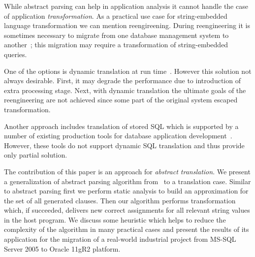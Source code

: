 While abstract parsing can help in application analysis it cannot handle the case of application
\emph{transformation}. As a practical use case for string-embedded language transformation we can mention
reengireening. During reengineering it is sometimes necessary to migrate from one database management 
system to another~\cite{NetDbTransform}; this migration may require a transformation of string-embedded 
queries. 

One of the options is dynamic translation at run time~\cite{OpenSystemsDBMS}. However this solution
not always desirable. First, it may degrade the performance due to introduction of extra processing stage. Next,
with dynamic translation the ultimate goals of the reengineering are not achieved since some part of
the original system escaped transformation. 

Another approach includes translation of stored SQL which is supported by a number of existing production tools 
for database application development~\cite{PLSQL,SwissSQL,SQLWays}. However, these tools do not support 
dynamic SQL translation and thus provide only partial solution. 

The contribution of this paper is an approach for \emph{abstract translation}. We present a generalization
of abstract parsing algorithm from~\cite{AbstrParsing} to a translation case. Similar to abstract parsing 
first we perform static analysis to build an approximation for the set of all generated clauses. Then our 
algorithm performs transformation which, if succeeded, delivers new correct assignments for all relevant 
string values in the host program. We discuss some heuristic which helps to reduce the complexity
of the algorithm in many practical cases and present the results of its application for the migration
of a real-world industrial project from MS-SQL Server 2005 to Oracle 11gR2 platform.





